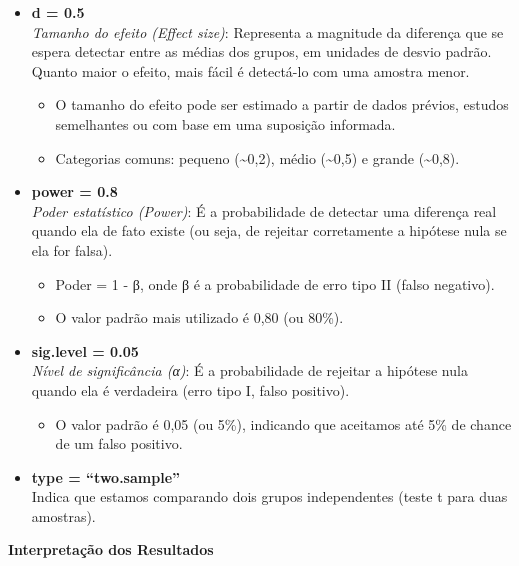 \documentclass[
]{book}
\providecommand{\tightlist}{%
  \setlength{\itemsep}{0pt}\setlength{\parskip}{0pt}}
\begin{document}
\begin{itemize}
\tightlist
\item
  \textbf{d = 0.5}\\
  \emph{Tamanho do efeito (Effect size)}: Representa a magnitude da diferença que se espera detectar entre as médias dos grupos, em unidades de desvio padrão. Quanto maior o efeito, mais fácil é detectá-lo com uma amostra menor.

  \begin{itemize}
  \tightlist
  \item
    O tamanho do efeito pode ser estimado a partir de dados prévios, estudos semelhantes ou com base em uma suposição informada.\\
  \item
    Categorias comuns: pequeno (\textasciitilde0,2), médio (\textasciitilde0,5) e grande (\textasciitilde0,8).
  \end{itemize}
\item
  \textbf{power = 0.8}\\
  \emph{Poder estatístico (Power)}: É a probabilidade de detectar uma diferença real quando ela de fato existe (ou seja, de rejeitar corretamente a hipótese nula se ela for falsa).

  \begin{itemize}
  \tightlist
  \item
    Poder = 1 - β, onde β é a probabilidade de erro tipo II (falso negativo).\\
  \item
    O valor padrão mais utilizado é 0,80 (ou 80\%).
  \end{itemize}
\item
  \textbf{sig.level = 0.05}\\
  \emph{Nível de significância (α)}: É a probabilidade de rejeitar a hipótese nula quando ela é verdadeira (erro tipo I, falso positivo).

  \begin{itemize}
  \tightlist
  \item
    O valor padrão é 0,05 (ou 5\%), indicando que aceitamos até 5\% de chance de um falso positivo.
  \end{itemize}
\item
  \textbf{type = ``two.sample''}\\
  Indica que estamos comparando dois grupos independentes (teste t para duas amostras).
\end{itemize}

\textbf{Interpretação dos Resultados}
\end{document}
